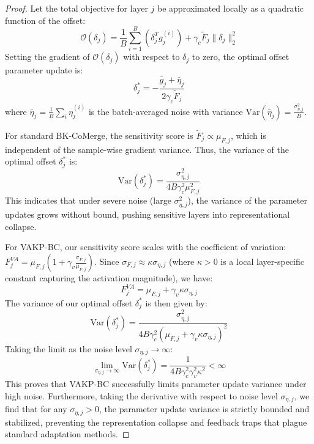 \documentclass{article}
\theoremstyle{plain}
\theoremstyle{definition}
\theoremstyle{remark}
\begin{document}
\begin{proof}
Let the total objective for layer $j$ be approximated locally as a quadratic function of the offset:
\begin{equation}
    \mathcal{O}(\delta_j) = \frac{1}{B} \sum_{i=1}^B \left( \delta_j^T g_j^{(i)} \right) + \gamma_c \tilde{F}_j \|\delta_j\|_2^2
\end{equation}
Setting the gradient of $\mathcal{O}(\delta_j)$ with respect to $\delta_j$ to zero, the optimal offset parameter update is:
\begin{equation}
    \delta_j^* = -\frac{\bar{g}_j + \bar{\eta}_j}{2 \gamma_c \tilde{F}_j}
\end{equation}
where $\bar{\eta}_j = \frac{1}{B} \sum_i \eta_j^{(i)}$ is the batch-averaged noise with variance $\mathrm{Var}(\bar{\eta}_j) = \frac{\sigma_{\eta, j}^2}{B}$.

For standard BK-CoMerge, the sensitivity score is $\tilde{F}_j \propto \mu_{F, j}$, which is independent of the sample-wise gradient variance. Thus, the variance of the optimal offset $\delta_j^*$ is:
\begin{equation}
    \mathrm{Var}(\delta_j^*) = \frac{\sigma_{\eta, j}^2}{4 B \gamma_c^2 \mu_{F, j}^2}
\end{equation}
This indicates that under severe noise (large $\sigma_{\eta, j}^2$), the variance of the parameter updates grows without bound, pushing sensitive layers into representational collapse.

For VAKP-BC, our sensitivity score scales with the coefficient of variation: $F_j^{VA} = \mu_{F, j} (1 + \gamma_v \frac{\sigma_{F, j}}{\mu_{F, j}})$. Since $\sigma_{F, j} \approx \kappa \sigma_{\eta, j}$ (where $\kappa > 0$ is a local layer-specific constant capturing the activation magnitude), we have:
\begin{equation}
    F_j^{VA} = \mu_{F, j} + \gamma_v \kappa \sigma_{\eta, j}
\end{equation}
The variance of our optimal offset $\delta_j^*$ is then given by:
\begin{equation}
    \mathrm{Var}(\delta_j^*) = \frac{\sigma_{\eta, j}^2}{4 B \gamma_c^2 (\mu_{F, j} + \gamma_v \kappa \sigma_{\eta, j})^2}
\end{equation}
Taking the limit as the noise level $\sigma_{\eta, j} \to \infty$:
\begin{equation}
    \lim_{\sigma_{\eta, j} \to \infty} \mathrm{Var}(\delta_j^*) = \frac{1}{4 B \gamma_c^2 \gamma_v^2 \kappa^2} < \infty
\end{equation}
This proves that VAKP-BC successfully limits parameter update variance under high noise. Furthermore, taking the derivative with respect to noise level $\sigma_{\eta, j}$, we find that for any $\sigma_{\eta, j} > 0$, the parameter update variance is strictly bounded and stabilized, preventing the representation collapse and feedback traps that plague standard adaptation methods.
\end{proof}
\end{document}
